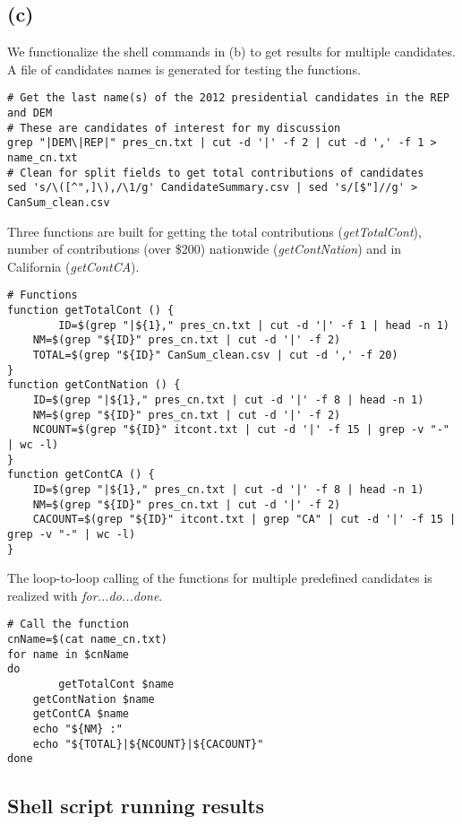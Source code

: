 \documentclass{article}
\begin{document}
\subsection*{(c)}

We functionalize the shell commands in (b) to get results for multiple candidates. A file of candidates names is generated for
testing the functions.

\begin{lstlisting}
# Get the last name(s) of the 2012 presidential candidates in the REP and DEM
# These are candidates of interest for my discussion
grep "|DEM\|REP|" pres_cn.txt | cut -d '|' -f 2 | cut -d ',' -f 1 > name_cn.txt
# Clean for split fields to get total contributions of candidates
sed 's/\([^",]\),/\1/g' CandidateSummary.csv | sed 's/[$"]//g' > CanSum_clean.csv
\end{lstlisting}

Three functions are built for getting the total contributions (\textit{getTotalCont}), number of contributions 
(over \$200) nationwide (\textit{getContNation}) and in California (\textit{getContCA}).

\begin{lstlisting}
# Functions
function getTotalCont () {
		ID=$(grep "|${1}," pres_cn.txt | cut -d '|' -f 1 | head -n 1)
    NM=$(grep "${ID}" pres_cn.txt | cut -d '|' -f 2)
    TOTAL=$(grep "${ID}" CanSum_clean.csv | cut -d ',' -f 20)
}
function getContNation () {
    ID=$(grep "|${1}," pres_cn.txt | cut -d '|' -f 8 | head -n 1)
    NM=$(grep "${ID}" pres_cn.txt | cut -d '|' -f 2)
    NCOUNT=$(grep "${ID}" itcont.txt | cut -d '|' -f 15 | grep -v "-" | wc -l)
}
function getContCA () {
    ID=$(grep "|${1}," pres_cn.txt | cut -d '|' -f 8 | head -n 1)
    NM=$(grep "${ID}" pres_cn.txt | cut -d '|' -f 2)
    CACOUNT=$(grep "${ID}" itcont.txt | grep "CA" | cut -d '|' -f 15 | grep -v "-" | wc -l)
}
\end{lstlisting}

The loop-to-loop calling of the functions for multiple predefined candidates is realized with \textit{for...do...done}.

\begin{lstlisting}
# Call the function
cnName=$(cat name_cn.txt)
for name in $cnName
do
		getTotalCont $name
    getContNation $name
    getContCA $name
    echo "${NM} :"
    echo "${TOTAL}|${NCOUNT}|${CACOUNT}"
done
\end{lstlisting}

\subsection*{Shell script running results}
\end{document}
